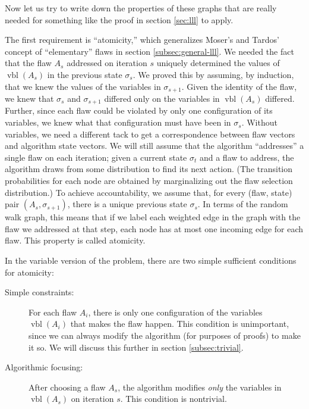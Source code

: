 \documentclass{article}
\begin{document}
Now let us try to write down the properties of these graphs that are really needed for something like the proof in section \ref{sec:lll} to apply.

The first requirement is ``atomicity,'' which generalizes Moser's and Tardos' concept of ``elementary'' flaws in section \ref{subsec:general-lll}.  We needed the fact that the flaw $A_s$ addressed on iteration $s$ uniquely determined the values of $\operatorname{vbl}(A_s)$ in the previous state $\sigma_s$.  We proved this by assuming, by induction, that we knew the values of the variables in $\sigma_{s+1}$.  Given the identity of the flaw, we knew that $\sigma_s$ and $\sigma_{s+1}$ differed only on the variables in $\operatorname{vbl}(A_s)$ differed.  Further, since each flaw could be violated by only one configuration of its variables, we knew what that configuration must have been in $\sigma_s$.  Without variables, we need a different tack to get a correspondence between flaw vectors and algorithm state vectors.  We will still assume that the algorithm ``addresses'' a single flaw on each iteration; given a current state $\sigma_t$ and a flaw to address, the algorithm draws from some distribution to find its next action.  (The transition probabilities for each node are obtained by marginalizing out the flaw selection distribution.)  To achieve accountability, we assume that, for every (flaw, state) pair $(A_{s}, \sigma_{s+1})$, there is a unique previous state $\sigma_s$.  In terms of the random walk graph, this means that if we label each weighted edge in the graph with the flaw we addressed at that step, each node has at most one incoming edge for each flaw.  This property is called atomicity.

In the variable version of the problem, there are two simple sufficient conditions for atomicity:
\begin{description}
  \item[Simple constraints:] For each flaw $A_i$, there is only one configuration of the variables $\operatorname{vbl}(A_i)$ that makes the flaw happen.  This condition is unimportant, since we can always modify the algorithm (for purposes of proofs) to make it so.  We will discuss this further in section \ref{subsec:trivial}.
  \item[Algorithmic focusing:] After choosing a flaw $A_s$, the algorithm modifies \emph{only} the variables in $\operatorname{vbl}(A_s)$ on iteration $s$.  This condition is nontrivial.
\end{description}
\end{document}

